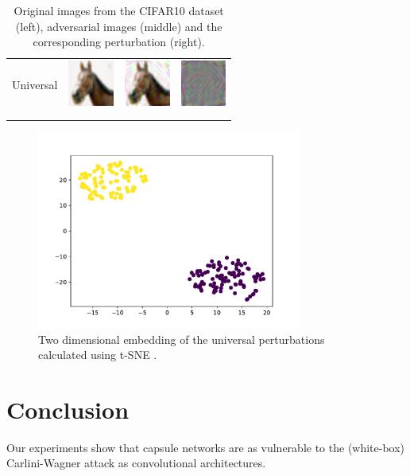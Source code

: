 \documentclass{article}
\begin{document}
\begin{table}[h]
\begin{tabular}{rlll}
	\\
	Universal & \includegraphics[height=1.5cm, align=c]{figures/universal_orig.pdf} & \includegraphics[height=1.5cm, align=c]{figures/universal_adversarial.pdf} & \includegraphics[height=1.5cm, align=c]{figures/universal_diff.pdf}\\
	\\
	\vspace{0.1cm}\\
	\end{tabular}
	\label{tab:images}
	\caption{Original images from the CIFAR10 dataset (left), adversarial images (middle) and the corresponding perturbation (right).}
\end{table}

\begin{figure}
	\centering
	\includegraphics[height=6.5cm]{figures/tsne.pdf}
	\caption{Two dimensional embedding of the universal perturbations calculated using t-SNE \cite{tsne}.}
\end{figure}


\FloatBarrier
\section{Conclusion}
Our experiments show that capsule networks are as vulnerable to the (white-box) Carlini-Wagner attack as convolutional architectures.



\end{document}
